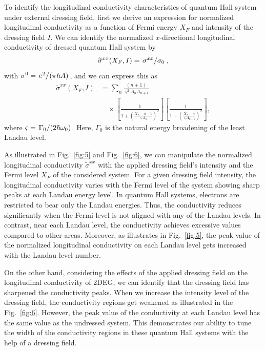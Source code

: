 
To identify the longitudinal conductivity characteristics of quantum Hall system under external dressing field, first we derive an expression for normalized longitudinal conductivity as a function of Fermi energy $X_F$ and intensity of the dressing field $I$.
We can identify the normalized $x$-directional longitudinal conductivity of dressed quantum Hall system by
\begin{equation}\label{eq:37}
  \widetilde{\sigma}^{xx}(X_F,I) =
  \flatfrac{\sigma^{xx}}{\sigma_{0}},
\end{equation}
with $\sigma^0 = \flatfrac{e^2}{(\pi \hbar A)}$, and we can express this as
\begin{equation} \label{eq:38}
  \begin{aligned}
    \widetilde{\sigma}^{xx}(X_F,I) &=
    \sum_{n}
    \frac{(n+1)}{\varsigma^2 \Lambda_n \Lambda_{n+1}} \\
    &\quad\times
    \left[
      \frac{1}
      {
        1 + \left(\frac{X_F - n -1}{\varsigma \Lambda_n}\right)^2
      }
    \right]
    \left[
      \frac{1}
      {
        1 + \left(\frac{X_F - n}{\varsigma \Lambda_{n+1}}\right)^2
      }
    \right],
  \end{aligned}
\end{equation}
where $\varsigma = \flatfrac{\Gamma_0}{(2\hbar \omega_0)}$. Here, $\Gamma_0$ is the natural energy broadening of the least Landau level.

As illustrated in Fig.~\ref{fig:5} and Fig.~\ref{fig:6}, we can manipulate the normalized longitudinal conductivity $\widetilde{\sigma}^{xx}$ with the applied dressing field's intensity and the Fermi level $X_F$ of the considered system.
For a given dressing field intensity, the longitudinal conductivity varies with  the Fermi level of the system showing sharp peaks at each Landau energy level.
In quantum Hall systems, electrons are restricted to bear only the Landau energies. Thus, the conductivity reduces significantly when the Fermi level is not aligned with any of the Landau levels. In contrast, near each Landau level, the conductivity achieves excessive values compared to other areas. Moreover, as illustrates in Fig.~\ref{fig:5}, the peak value of the normalized longitudinal conductivity on each Landau level gets increased with the Landau level number.

On the other hand, considering the effects of the applied dressing field on the longitudinal conductivity of 2DEG, we can identify that the dressing field has sharpened the conductivity peaks.
When we increase the intensity level of the dressing field, the conductivity regions get weakened as illustrated in the Fig.~\ref{fig:6}.
However, the peak value of the conductivity at each Landau level has the same value as the undressed system. This demonstrates our ability to tune the width of the conductivity regions in these quantum Hall systems with the help of a dressing field.

